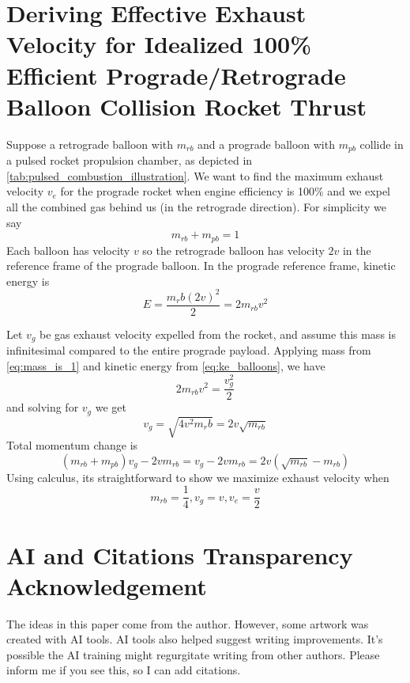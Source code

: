 \documentclass{article}
\begin{document}
\section{Deriving Effective Exhaust Velocity for Idealized 100\% Efficient Prograde/Retrograde Balloon Collision Rocket Thrust}\label{sec:dv_effective}
Suppose a retrograde balloon with $m_{rb}$ and a prograde balloon with $m_{pb}$ collide in a pulsed rocket propulsion chamber, as depicted in \autoref{tab:pulsed_combustion_illustration}.  We want to find the maximum exhaust velocity $v_e$ for the prograde rocket  when engine efficiency is 100\% and we expel all the combined gas behind us (in the retrograde direction).   For simplicity we say 
\begin{equation}
m_{rb} + m_{pb} = 1\label{eq:mass_is_1}
\end{equation} 
Each balloon has velocity $v$ so the retrograde balloon has velocity $2v$ in the reference frame of the prograde balloon.   In the prograde reference frame, kinetic energy is
\begin{equation}
E = \frac{m_rb (2v)^2}{2} = 2m_{rb}v^2\label{eq:ke_balloons}
\end{equation}

Let $v_g$ be gas exhaust velocity expelled from the rocket, and assume this mass is infinitesimal compared to the entire prograde payload.  Applying mass from \autoref{eq:mass_is_1}
 and kinetic energy from \autoref{eq:ke_balloons}, we have 
 \begin{equation}
 2m_{rb}v^2= \frac{v_g^2}{2}
 \end{equation}
 and solving for $v_g$ we get 
 \begin{equation}
 v_g = \sqrt{4v^2m_rb} = 2v\sqrt{m_{rb}} \label{eq:vg_result}
 \end{equation}
 Total momentum change is 
 \[(m_{rb} + m_{pb})v_g - 2vm_{rb} = v_g-2vm_{rb} = 2v(\sqrt{m_{rb}} - m_{rb}) \]
 Using calculus, its straightforward to show we maximize exhaust velocity when 
 \begin{equation}
 m_{rb} = \frac{1}{4}, \label{eq:max_m_rb}
 v_g = v,
 v_e= \frac{v}{2}
 \end{equation}

 \section{AI and Citations Transparency Acknowledgement}
 The ideas in this paper come from the author.  However, some artwork was created with AI tools.  AI tools also helped suggest writing improvements.  It's possible the AI training might regurgitate writing from other authors.   Please inform me if you see this, so I can add citations.  
\end{document}
